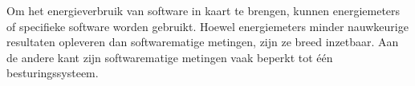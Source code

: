 Om het energieverbruik van software in kaart te brengen, kunnen energiemeters of specifieke software worden gebruikt. Hoewel energiemeters minder nauwkeurige resultaten opleveren dan softwarematige metingen, zijn ze breed inzetbaar. Aan de andere kant zijn softwarematige metingen vaak beperkt tot één besturingssysteem.\\








